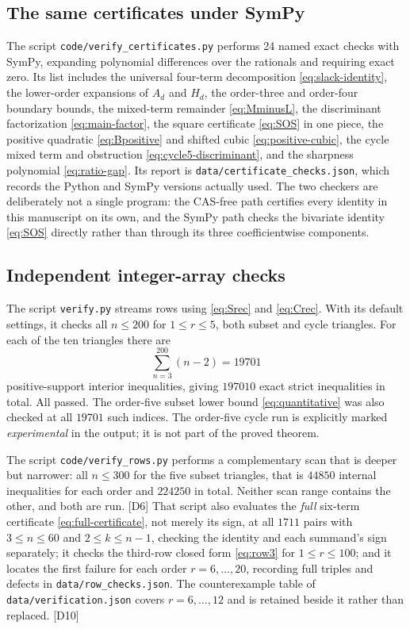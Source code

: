 \documentclass[11pt,a4paper]{article}
\numberwithin{equation}{section}
\theoremstyle{definition}
\theoremstyle{remark}
\newcommand{\dup}[1]{{\small\textsf{\color{MutedInk}[#1]}}}
\begin{document}
\subsection{The same certificates under SymPy}

The script \texttt{code/verify\_certificates.py} performs 24 named exact
checks with SymPy, expanding polynomial differences over the rationals and
requiring exact zero. Its list includes the universal four-term
decomposition \eqref{eq:slack-identity}, the lower-order expansions of
$A_d$ and $H_d$, the order-three and order-four boundary bounds, the
mixed-term remainder \eqref{eq:MminusL}, the discriminant factorization
\eqref{eq:main-factor}, the square certificate \eqref{eq:SOS} in one piece,
the positive quadratic \eqref{eq:Bpositive} and shifted cubic
\eqref{eq:positive-cubic}, the cycle mixed term and obstruction
\eqref{eq:cycle5-discriminant}, and the sharpness polynomial
\eqref{eq:ratio-gap}. Its report is \texttt{data/certificate\_checks.json},
which records the Python and SymPy versions actually used.
The two checkers are deliberately not a single program: the
CAS-free path certifies every identity in this manuscript on its own,
and the SymPy path checks the bivariate identity \eqref{eq:SOS} directly
rather than through its three coefficientwise components.

\subsection{Independent integer-array checks}

The script \texttt{verify.py} streams rows using \eqref{eq:Srec} and
\eqref{eq:Crec}. With its default settings, it checks all $n\le200$ for
$1\le r\le5$, both subset and cycle triangles. For each of the ten
triangles there are
\[
 \sum_{n=3}^{200}(n-2)=19701
\]
positive-support interior inequalities, giving $197010$ exact strict
inequalities in total. All passed. The order-five subset lower bound
\eqref{eq:quantitative} was also checked at all $19701$ such indices.
The order-five cycle run is explicitly marked \emph{experimental} in the
output; it is not part of the proved theorem.

The script \texttt{code/verify\_rows.py} performs a complementary scan
that is deeper but narrower: all $n\le300$ for the five subset triangles,
that is $44850$ internal inequalities for each order and $224250$ in
total. Neither scan range contains the other, and both are run. \dup{D6}
That script also evaluates the \emph{full} six-term certificate
\eqref{eq:full-certificate}, not merely its sign, at all $1711$ pairs with
$3\le n\le60$ and $2\le k\le n-1$, checking the identity and each
summand's sign separately; it checks the third-row closed form
\eqref{eq:row3} for $1\le r\le100$; and it locates the first failure for
each order $r=6,\ldots,20$, recording full triples and defects in
\texttt{data/row\_checks.json}. The counterexample table of
\texttt{data/verification.json} covers $r=6,\ldots,12$ and is retained
beside it rather than replaced. \dup{D10}
\end{document}
